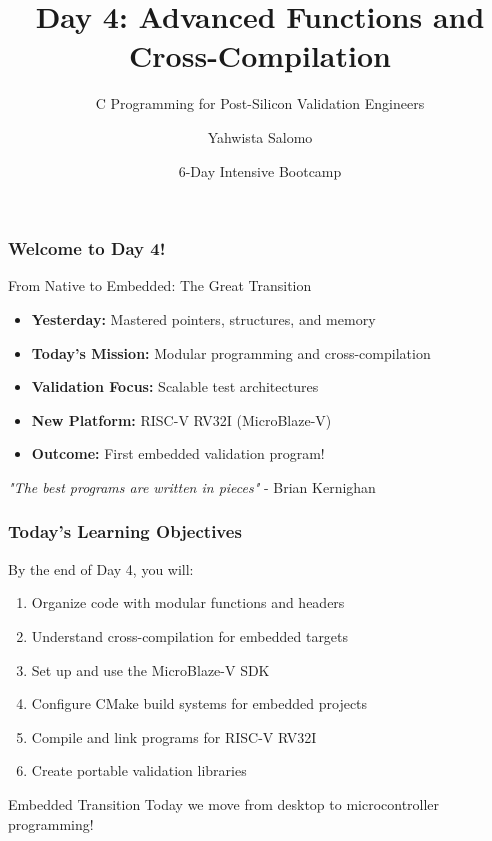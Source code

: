 \documentclass{beamer}
\title{Day 4: Advanced Functions and Cross-Compilation}
\subtitle{C Programming for Post-Silicon Validation Engineers}
\author{Yahwista Salomo}
\date{6-Day Intensive Bootcamp}
\institute{Post-Silicon Validation Training Program}
\begin{document}
\frame{\titlepage}

\begin{frame}
\frametitle{Welcome to Day 4!}
\begin{center}
\Large From Native to Embedded: The Great Transition
\end{center}

\begin{itemize}
    \item \textbf{Yesterday:} Mastered pointers, structures, and memory
    \item \textbf{Today's Mission:} Modular programming and cross-compilation
    \item \textbf{Validation Focus:} Scalable test architectures
    \item \textbf{New Platform:} RISC-V RV32I (MicroBlaze-V)
    \item \textbf{Outcome:} First embedded validation program!
\end{itemize}

\vspace{0.5cm}
\begin{center}
\textit{"The best programs are written in pieces"} - Brian Kernighan
\end{center}
\end{frame}

\begin{frame}
\frametitle{Today's Learning Objectives}
By the end of Day 4, you will:

\begin{enumerate}
    \item Organize code with modular functions and headers
    \item Understand cross-compilation for embedded targets
    \item Set up and use the MicroBlaze-V SDK
    \item Configure CMake build systems for embedded projects
    \item Compile and link programs for RISC-V RV32I
    \item Create portable validation libraries
\end{enumerate}

\vspace{0.5cm}
\begin{alertblock}{Embedded Transition}
Today we move from desktop to microcontroller programming!
\end{alertblock}
\end{frame}
\end{document}
